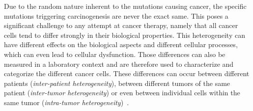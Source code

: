 Due to the random nature inherent to the mutations causing cancer, the specific mutations triggering carcinogenesis are never the exact same.
This poses a significant challenge to any attempt at cancer therapy, namely that all cancer cells tend to differ strongly in their biological properties.
This heterogeneity can have different effects on the biological aspects and different cellular processes, which can even lead to cellular dysfunction.
Those differences can also be measured in a laboratory context and are therefore used to characterize and categorize the different cancer cells.
These differences can occur between different patients (\textit{inter-patient heterogeneity}), between different tumors of the same patient (\textit{inter-tumor heterogeneity}) or even between individual cells within the same tumor (\textit{intra-tumor heterogeneity})~\cite{heterogeneity-implications-targeted-therapeutics}.\\
